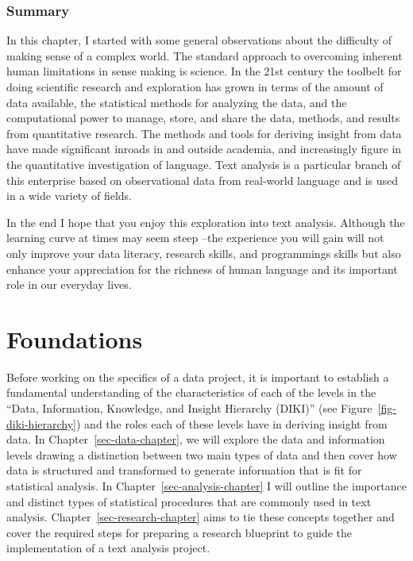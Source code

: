 \documentclass[
  letterpaper,
]{latex/krantz}
\theoremstyle{definition}
\theoremstyle{remark}
\begin{document}
\section*{Summary}\label{summary}


In this chapter, I started with some general observations about the
difficulty of making sense of a complex world. The standard approach to
overcoming inherent human limitations in sense making is science. In the
21st century the toolbelt for doing scientific research and exploration
has grown in terms of the amount of data available, the statistical
methods for analyzing the data, and the computational power to manage,
store, and share the data, methods, and results from quantitative
research. The methods and tools for deriving insight from data have made
significant inroads in and outside academia, and increasingly figure in
the quantitative investigation of language. Text analysis is a
particular branch of this enterprise based on observational data from
real-world language and is used in a wide variety of fields.

In the end I hope that you enjoy this exploration into text analysis.
Although the learning curve at times may seem steep --the experience you
will gain will not only improve your data literacy, research skills, and
programmings skills but also enhance your appreciation for the richness
of human language and its important role in our everyday lives.

\part{Foundations}

Before working on the specifics of a data project, it is important to
establish a fundamental understanding of the characteristics of each of
the levels in the ``Data, Information, Knowledge, and Insight Hierarchy
(DIKI)'' (see Figure~\ref{fig-diki-hierarchy}) and the roles each of
these levels have in deriving insight from data. In
Chapter~\ref{sec-data-chapter}, we will explore the data and information
levels drawing a distinction between two main types of data and then
cover how data is structured and transformed to generate information
that is fit for statistical analysis. In
Chapter~\ref{sec-analysis-chapter} I will outline the importance and
distinct types of statistical procedures that are commonly used in text
analysis. Chapter~\ref{sec-research-chapter} aims to tie these concepts
together and cover the required steps for preparing a research blueprint
to guide the implementation of a text analysis project.
\end{document}
